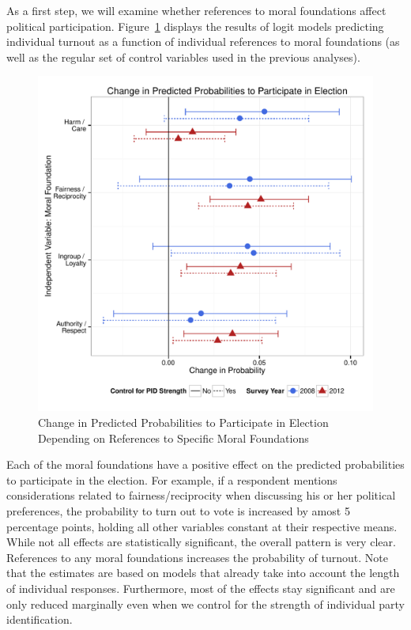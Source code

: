 \documentclass[12pt]{article}
\begin{document}
As a first step, we will examine whether references to moral foundations affect political participation. Figure~\ref{fig:m2b_vote} displays the results of logit models predicting individual turnout as a function of individual references to moral foundations (as well as the regular set of control variables used in the previous analyses).

\begin{figure}[ht]\centering
\includegraphics[scale=.5]{../calc/fig/m2b_vote.pdf}
\caption{Change in Predicted Probabilities to Participate in Election Depending on References to Specific Moral Foundations}\label{fig:m2b_vote}
\end{figure}

Each of the moral foundations have a positive effect on the predicted probabilities to participate in the election. For example, if a respondent mentions considerations related to fairness/reciprocity when discussing his or her political preferences, the probability to turn out to vote is increased by amost 5 percentage points, holding all other variables constant at their respective means. While not all effects are statistically significant, the overall pattern is very clear. References to any moral foundations increases the probability of turnout. Note that the estimates are based on models that already take into account the length of individual responses. Furthermore, most of the effects stay significant and are only reduced marginally even when we control for the strength of individual party identification.
\end{document}
